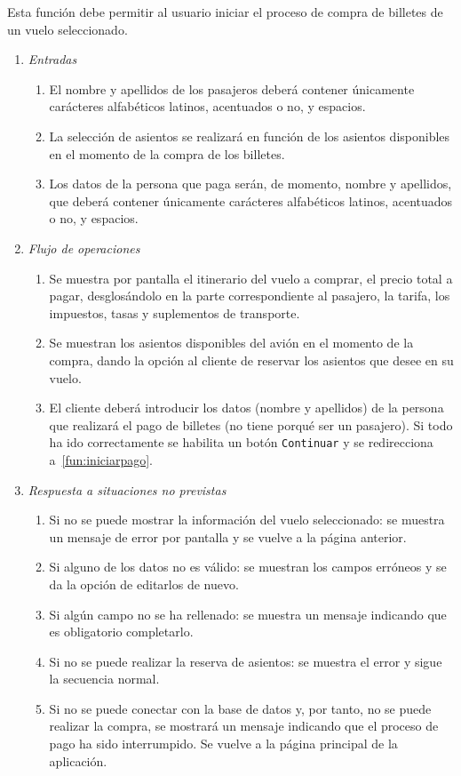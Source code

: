 	Esta función debe permitir al usuario iniciar el proceso de compra de billetes de un vuelo seleccionado.		

	\begin{enumerate}
		\item \textit{Entradas}
			\begin{enumerate}
				\item El nombre y apellidos de los pasajeros deberá contener únicamente carácteres alfabéticos latinos, acentuados o no, y espacios.
				\item La selección de asientos se realizará en función de los asientos disponibles en el momento de la compra de los billetes.
				\item Los datos de la persona que paga serán, de momento, nombre y apellidos,  que deberá contener únicamente carácteres alfabéticos latinos, acentuados o no, y espacios.							
			\end{enumerate}
		\item \textit{Flujo de operaciones}
			\begin{enumerate}
				\item Se muestra por pantalla el itinerario del vuelo a comprar, el precio total a pagar, desglosándolo en la parte correspondiente al pasajero, la tarifa, los impuestos, tasas y suplementos de transporte.
				\item Se muestran los asientos disponibles del avión en el momento de la compra, dando la opción al cliente de reservar los asientos que desee en su vuelo.
				\item El cliente deberá introducir los datos (nombre y apellidos) de la persona que realizará el pago de billetes (no tiene porqué ser un pasajero). Si todo ha ido correctamente se habilita un botón \verb|Continuar| y se redirecciona a~\ref{fun:iniciarpago}.
			\end{enumerate}
		\item \textit{Respuesta a situaciones no previstas}
			\begin{enumerate}
				\item Si no se puede mostrar la información del vuelo seleccionado: se muestra un mensaje de error por pantalla y se vuelve a la página anterior.
				\item Si alguno de los datos no es válido: se muestran los campos erróneos y se da la opción de editarlos de nuevo.
				\item Si algún campo no se ha rellenado: se muestra un mensaje indicando que es obligatorio completarlo.
				\item Si no se puede realizar la reserva de asientos: se muestra el error y sigue la secuencia normal.
				\item Si no se puede conectar con la base de datos y, por tanto, no se puede realizar la compra,  se mostrará un mensaje indicando que el proceso de pago ha sido interrumpido. Se vuelve a la página principal de la aplicación.
			\end{enumerate}
	\end{enumerate}
								
